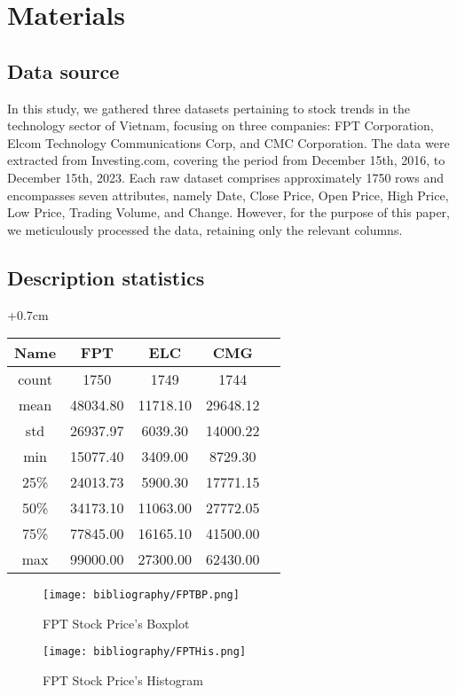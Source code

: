 \documentclass{ieeeojies}
\begin{document}
\section{Materials}
\label{sec:materials}
\subsection{Data source}
In this study, we gathered three datasets pertaining to stock trends in the technology sector of Vietnam, focusing on three companies: FPT Corporation, Elcom Technology Communications Corp, and CMC Corporation. The data were extracted from Investing.com, covering the period from December 15th, 2016, to December 15th, 2023. Each raw dataset comprises approximately 1750 rows and encompasses seven attributes, namely Date, Close Price, Open Price, High Price, Low Price, Trading Volume, and Change. However, for the purpose of this paper, we meticulously processed the data, retaining only the relevant columns.

\subsection{Description statistics} 


\begin{adjustwidth}{+0.7cm}{}

\begin{tabular}{|c|c|c|c|c|}
\hline
Name & FPT & ELC & CMG \\
\hline
count & 1750 & 1749 & 1744\\
\hline
mean & 48034.80 & 11718.10 & 29648.12 \\
\hline
std & 26937.97 & 6039.30 & 14000.22 \\
\hline
min & 15077.40 & 3409.00 & 8729.30\\
\hline
25\% & 24013.73 & 5900.30 & 17771.15\\
\hline
50\% & 34173.10 & 11063.00 & 27772.05\\
\hline
75\% & 77845.00 & 16165.10 & 41500.00\\
\hline
max & 99000.00 & 27300.00 & 62430.00\\
\hline  
\end{tabular}
\end{adjustwidth}
\begin{figure}[H]
    \centering
    \begin{minipage}{0.23\textwidth}
    \centering
    \texttt{[image: bibliography/FPTBP.png]}
    \caption{FPT Stock Price's Boxplot}
    \label{fig:1}
    \end{minipage}
    \hfill
    \begin{minipage}{0.23\textwidth}
    \centering
    \texttt{[image: bibliography/FPTHis.png]}
    \caption{FPT Stock Price's Histogram}
    \label{fig:2}
    \end{minipage}
\end{figure}
\end{document}
